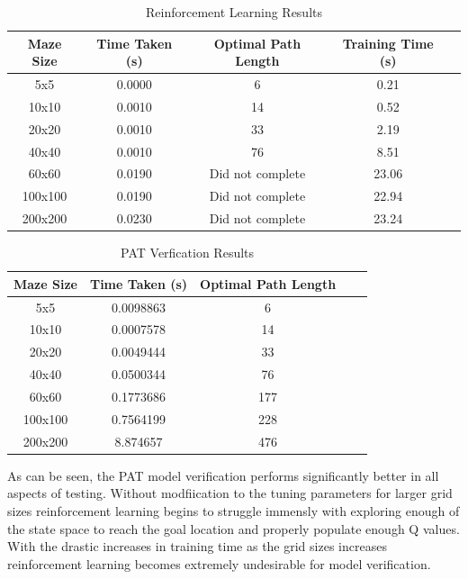 \documentclass[twoside, 12pt, a4paper]{article}
\begin{document}
\begin{table}[ht]
\begin {center}
\begin{tabular}{ | c | c | c | c | c |}

\hline
 \textbf{Maze Size} & \textbf{ Time Taken (s)} &  \textbf{Optimal Path Length} &  \textbf{Training Time (s)} \\
\hline
5x5 		& 0.0000	&6	 &0.21\\
10x10 	& 0.0010	&14	 &0.52\\
20x20 	& 0.0010	&33	 &2.19\\
40x40		& 0.0010	&76	 &8.51\\
60x60 	& 0.0190	&Did not complete	 &23.06\\
100x100	& 0.0190	&Did not complete	 &22.94\\
200x200	& 0.0230	&Did not complete	 &23.24\\
\hline
\end {tabular}
\caption{\label{tab:table-name}Reinforcement Learning Results}
\end {center}
\end{table}



\begin{table}[ht]
\begin {center}
\begin{tabular}{ | c | c | c | c | c |}

\hline
 \textbf{Maze Size} & \textbf{ Time Taken (s)} &  \textbf{Optimal Path Length}  \\
\hline
5x5 		& 0.0098863	& 6	 \\
10x10 	& 0.0007578	& 14	 \\
20x20 	& 0.0049444 & 33	 \\
40x40		& 0.0500344	& 76	 \\
60x60 	& 0.1773686	& 177	 \\
100x100	& 0.7564199	& 228	 \\
200x200	& 8.874657	& 476	 \\
\hline
\end {tabular}
\caption{\label{tab:table-name}PAT Verfication Results}
\end {center}
\end{table}
As can be seen, the PAT model verification performs significantly better in all aspects of testing. Without modfiication to the tuning parameters for larger grid sizes reinforcement learning begins to struggle immensly with exploring enough of the state space to reach the goal location and properly populate enough Q values. With the drastic increases in training time as the grid sizes increases reinforcement learning becomes extremely undesirable for model verification.
\end{document}

